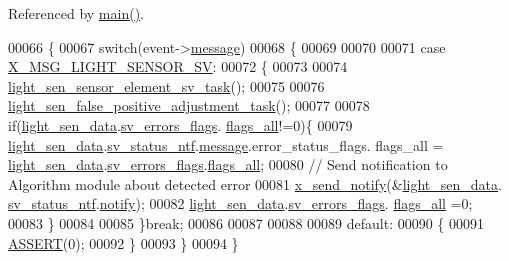 Referenced by \hyperlink{a00048_source_l00080}{main()}.


\begin{DoxyCode}
00066 \{
00067     \textcolor{keywordflow}{switch}(event->\hyperlink{a00036_adf9665938515a20c283eea2c978cf80d}{message})
00068     \{
00069 
00070     
00071         \textcolor{keywordflow}{case} \hyperlink{a00024_a5877f449ae4b7e77914fedf212c3d01f}{X\_MSG\_LIGHT\_SENSOR\_SV}:
00072         \{
00073 
00074             \hyperlink{a00047_ae68a20cad10654012eae75a1941f53db}{light\_sen\_sensor\_element\_sv\_task}();
00075 
00076             \hyperlink{a00047_a05bd338db50fc948cf13db4f250894da}{light\_sen\_false\_positive\_adjustment\_task}();
00077 
00078             \textcolor{keywordflow}{if}(\hyperlink{a00047_a53c98c9f84d5cecf0747bbe1f6b83696}{light\_sen\_data}.\hyperlink{a00024_aaeec6b0609dba31393f337abf1cce3d3}{sv\_errors\_flags}.
      \hyperlink{a00022_a1caa87b00c878186140c3bac9c8acf3b}{flags\_all}!=0)\{
00079              \hyperlink{a00047_a53c98c9f84d5cecf0747bbe1f6b83696}{light\_sen\_data}.\hyperlink{a00024_a35ce77844e6990e2537b2f11cd2d5cca}{sv\_status\_ntf}.\hyperlink{a00018_a18ed963ee616596e9d500e042f228818}{message}.error\_status\_flags.
      flags\_all = \hyperlink{a00047_a53c98c9f84d5cecf0747bbe1f6b83696}{light\_sen\_data}.\hyperlink{a00024_aaeec6b0609dba31393f337abf1cce3d3}{sv\_errors\_flags}.\hyperlink{a00022_a1caa87b00c878186140c3bac9c8acf3b}{flags\_all};
00080              \textcolor{comment}{// Send notification to Algorithm module about detected error}
00081              \hyperlink{a00036_ae17b0bb16da3c471bb6074bb4c4d0fee}{x\_send\_notify}(&\hyperlink{a00047_a53c98c9f84d5cecf0747bbe1f6b83696}{light\_sen\_data}.
      \hyperlink{a00024_a35ce77844e6990e2537b2f11cd2d5cca}{sv\_status\_ntf}.\hyperlink{a00018_a8e6a04c2283f9fd7b8dcbc62faba5847}{notify});
00082              \hyperlink{a00047_a53c98c9f84d5cecf0747bbe1f6b83696}{light\_sen\_data}.\hyperlink{a00024_aaeec6b0609dba31393f337abf1cce3d3}{sv\_errors\_flags}.
      \hyperlink{a00022_a1caa87b00c878186140c3bac9c8acf3b}{flags\_all} =0;
00083             \}
00084             
00085         \}\textcolor{keywordflow}{break};
00086       
00087 
00088         
00089         \textcolor{keywordflow}{default}:
00090         \{
00091             \hyperlink{a00072_abb8ff8e213ac9f6fb21d2b968583b936}{ASSERT}(0);
00092         \}        
00093     \}
00094 \}
\end{DoxyCode}


